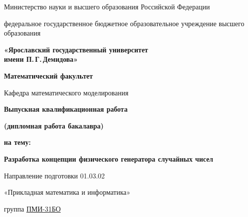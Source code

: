 \begin{titlepage}
\thispagestyle{empty}
\centering
\singlespacing
\normalfont

{\small
Министерство науки и высшего образования Российской Федерации\par\vspace{0.5em}
федеральное государственное бюджетное образовательное учреждение высшего образования\par\vspace{0.5em}
{\large\bfseries «Ярославский государственный университет\\
имени П.\,Г.\,Демидова»}\par\vspace{0.7em}
\bfseries Математический факультет\par\vspace{0.35em}
{\mdseries Кафедра математического моделирования}%
}

\vspace{1.8cm}

{\large\bfseries Выпускная квалификационная работа}\par\vspace{0.35em}
{\normalsize\bfseries (дипломная работа бакалавра)}\par\vspace{1.1em}

{\large\bfseries на тему:}\par\vspace{0.55em}
{\Large\bfseries Разработка концепции физического генератора случайных чисел\par}

\vspace{1.1cm}

{\large
Направление подготовки 01.03.02\par\vspace{0.25em}
«Прикладная математика и информатика»\par\vspace{0.55em}
группа \ul{ПМИ-31БО}%
}

\vfill


\end{titlepage}
